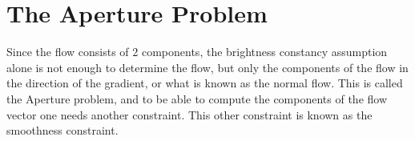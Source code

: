 \section{The Aperture Problem}
Since the flow consists of 2 components, the brightness constancy assumption alone is not enough to determine the flow, but only the components of the flow in the direction of the gradient, or what is known as the normal flow. This is called the Aperture problem, and to be able to compute the components of the flow vector one needs another constraint. This other constraint is known as the smoothness constraint.